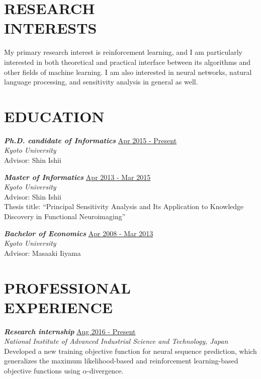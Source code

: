 \documentclass[margin, 10pt]{res} %
\begin{document}
\begin{resume}

\section{{\small RESEARCH\\INTERESTS}}

My primary research interest is reinforcement learning, and I am particularly interested in both theoretical and practical interface between its algorithms and other fields of machine learning. I am also interested in neural networks, natural language processing, and sensitivity analysis in general as well.

\section{{\small EDUCATION}}

{\sl {\bf Ph.D. candidate of Informatics}} \hfill {\small \underline{Apr 2015 - Present}} \\
{\it Kyoto University} \\
Advisor: Shin Ishii

{\sl {\bf Master of Informatics}} \hfill {\small \underline{Apr 2013 - Mar 2015}}  \\
{\it Kyoto University} \\
Advisor: Shin Ishii \\
Thesis title: ``Principal Sensitivity Analysis and Its Application to Knowledge Discovery in Functional Neuroimaging''

{\sl {\bf Bachelor of Economics}} \hfill {\small \underline{Apr 2008 - Mar 2013}} \\
{\it Kyoto University} \\
Advisor: Masaaki Iiyama
  
\section{{\small PROFESSIONAL\\EXPERIENCE}}

{\sl {\bf Research internship}} \hfill {\small \underline{Aug 2016 - Present}} \\
{\it National Institute of Advanced Industrial Science and Technology, Japan} \\
Developed a new training objective function for neural sequence prediction, which generalizes the maximum likelihood-based and reinforcement learning-based objective functions using $\alpha$-divergence.


\end{resume}
\end{document}
